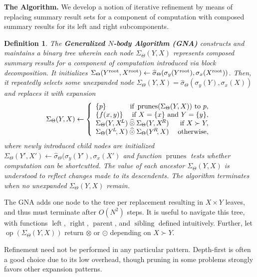 \documentclass{article}
\newtheorem{definition} {Definition}
\newcommand{\killspace}{\vspace{-0.08in}}
\newcommand{\GNP}[1][\psi]{{#1}_{\Theta}}
\newcommand{\sigmahat}{\mathbin{\widehat{\sigma}}}
\newcommand{\otimeshat}{\mathbin{\widehat{\otimes}}}
\newcommand{\odothat}{\mathbin{\widehat{\odot}}}
\DeclareMathOperator{\prunes}{prunes}
\DeclareMathOperator{\leftchild}{left}
\DeclareMathOperator{\rightchild}{right}
\DeclareMathOperator{\parent}{parent}
\DeclareMathOperator{\sibling}{sibling}
\DeclareMathOperator{\op}{op}
\newcommand{\kdroot}[1]{#1^{\text{\rm root}}}
\newcommand{\kdleft}[1]{#1^{\!L}}
\newcommand{\kdright}[1]{#1^{\!R}}
\begin{document}
{\bf The Algorithm.}  We develop a notion of iterative refinement by
means of replacing summary result sets for a component of computation
with composed summary results for its left and right subcomponents.
\begin{definition}
  The {\bf Generalized $N$-body Algorithm (GNA)} constructs and
  maintains a binary tree wherein each node $\GNP[\Sigma](Y,X)$
  represents composed summary results for a component of computation
  introduced via block decomposition.  It initializes
  $\GNP[\Sigma](\kdroot{Y},\kdroot{X}) \gets
  \GNP[\sigmahat](\sigma_y(\kdroot{Y}),\sigma_x(\kdroot{X}))$.  Then,
  it repeatedly selects some unexpanded node $\GNP[\Sigma](Y,X) =
  \GNP[\sigmahat](\sigma_y(Y),\sigma_x(X))$ and replaces it with
  expansion
  \[
  \GNP[\Sigma](Y,X) \gets \left\{ \begin{array}{lrr}
    \{p\} & \multicolumn{2}{r}{\mbox{\rm if } \prunes(\GNP[\Sigma](Y,X)) \mbox{ \rm to } p,} \\
    \{f(x,y)\} & \multicolumn{2}{r}{\mbox{\rm if } X = \{x\} \mbox{ \rm and } Y = \{y\},} \\
    \multicolumn{2}{l}{\GNP[\Sigma](Y,\kdleft{X}) \otimeshat \GNP[\Sigma](Y,\kdright{X})} & \mbox{\rm if } X \succ Y, \\
    \multicolumn{2}{l}{\GNP[\Sigma](\kdleft{Y}\!,X) \odothat \GNP[\Sigma](\kdright{Y}\!,X)} & \mbox{\rm otherwise},
  \end{array} \right.
  \]
  where newly introduced child nodes are initialized
  $\GNP[\Sigma](Y',X') \gets
  \GNP[\sigmahat](\sigma_y(Y'),\sigma_x(X')$ and function $\prunes$
  tests whether computation can be shortcutted.  The value of each
  ancestor $\GNP[\Sigma](Y,X)$ is understood to reflect changes made
  to its descendents.  The algorithm terminates when no unexpanded
  $\GNP[\Sigma](Y,X)$ remain.
\end{definition}
\killspace
\noindent The GNA adds one node to the tree per replacement resulting in $X \times Y$ leaves, and thus must terminate after $O(N^2)$ steps.
It is useful to navigate this tree, with functions $\leftchild$, $\rightchild$, $\parent$, and $\sibling$ defined intuitively.
Further, let $\op(\GNP[\Sigma](Y,X))$ return $\otimes$ or $\odot$ depending on $X \succ Y$.

Refinement need not be performed in any particular pattern.
Depth-first is often a good choice due to its low overhead, though
pruning in some problems strongly favors other expansion patterns.
\end{document}
